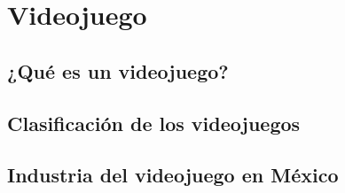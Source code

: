 \section{Videojuego}
			\subsection{¿Qué es un videojuego?}
			\subsection{Clasificación de los videojuegos}
			\subsection{Industria del videojuego en México}	
		
